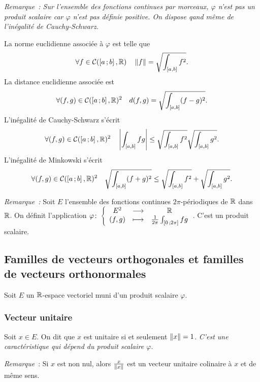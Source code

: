 \emph{Remarque~: Sur l'ensemble des fonctions continues par morceaux, $\varphi$ n'est pas un produit scalaire car $\varphi$ n'est pas définie positive. On dispose qand même de l'inégalité de Cauchy-Schwarz.}

La norme euclidienne associée à $\varphi$ est telle que
\begin{equation}
  \forall f \in \mathcal{C}(\left[ a \, ;  b \right],\mathbb{R}) \quad \left\lVert f\right\rVert=\sqrt{\int_{[a,b]}f^2}.
\end{equation}
La distance euclidienne associée est 
\begin{equation}
  \forall (f,g) \in \mathcal{C}(\left[ a \, ;  b \right],\mathbb{R})^2 \quad d(f,g)=\sqrt{\int_{[a,b]}(f-g)^2}.
\end{equation}
L'inégalité de Cauchy-Schwarz s'écrit
\begin{equation}
  \forall (f,g) \in \mathcal{C}(\left[ a \, ;  b \right],\mathbb{R})^2 \quad \left\lvert\int_{[a,b]}fg\right\rvert \leq \sqrt{\int_{[a,b]}f^2} \sqrt{\int_{[a,b]}g^2}.
\end{equation}
L'inégalité de Minkowski s'écrit
\begin{equation}
  \forall (f,g) \in \mathcal{C}(\left[ a \, ;  b \right],\mathbb{R})^2 \quad \sqrt{\int_{[a,b]}(f+g)^2} \leq \sqrt{\int_{[a,b]}f^2} + \sqrt{\int_{[a,b]}g^2}.
\end{equation}

\emph{Remarque~:} Soit $E$ l'ensemble des fonctions continues $2\pi$-périodiques de $\mathbb{R}$ dans $\mathbb{R}$. On définit l'application $\varphi\colon \left\{\begin{array}{ccc} E^2 & \longrightarrow &\mathbb{R}\\ (f,g) & \longmapsto & \frac{1}{2\pi}\int_{\left[ 0 \, ;  2\pi \right]}fg \end{array} \right.$. C'est un produit scalaire.

\subsection{Familles de vecteurs orthogonales et familles de vecteurs orthonormales}

Soit $E$ un $\mathbb{R}$-espace vectoriel muni d'un produit scalaire $\varphi$.

\subsubsection{Vecteur unitaire}

\begin{defdef}
  Soit $x \in E$. On dit que $x$ est unitaire si et seulement $\left\lVert x\right\rVert=1$. \emph{C'est une caractéristique qui dépend du produit scalaire $\varphi$}.
\end{defdef}

\emph{Remarque}~: Si $x$ est non nul, alors $\frac{x}{\left\lVert x\right\rVert}$ est un vecteur unitaire colinaire à $x$ et de même sens.

